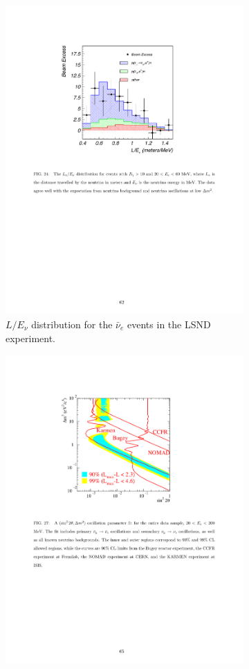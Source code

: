 \begin{figure}[htbp]
  \begin{subfigure}{0.48\textwidth}
    \includegraphics[height=\linewidth]{figures/lsndresult.pdf}
    \caption{$L/E_{\nu}$ distribution for the $\bar{\nu}_{e}$ events in the LSND experiment.}\label{fig:resultlsnd}
  \end{subfigure}\hfill
  \begin{subfigure}{0.48\textwidth}
    \begin{center}
        \includegraphics[height=\linewidth]{figures/lsnd_space.pdf}

\end{center}
\end{subfigure}
\end{figure}

